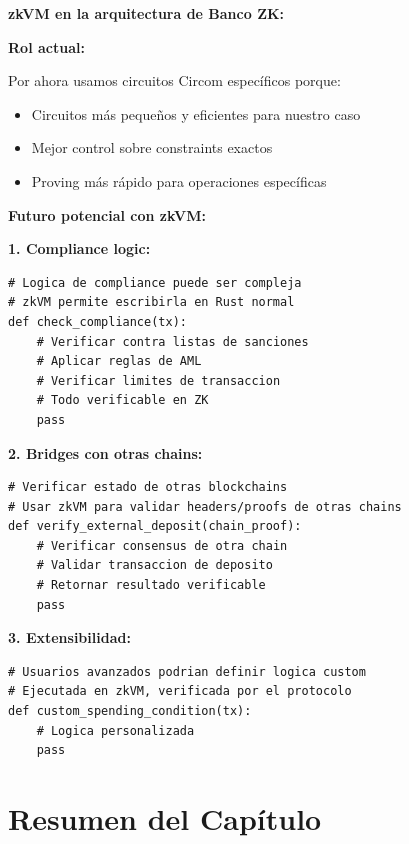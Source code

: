 \documentclass[11pt,a4paper,twoside]{book}
\begin{document}
\begin{bancozk}
\textbf{zkVM en la arquitectura de Banco ZK:}

\textbf{Rol actual:}

Por ahora usamos circuitos Circom espec\'ificos porque:
\begin{itemize}
    \item Circuitos m\'as peque\~nos y eficientes para nuestro caso
    \item Mejor control sobre constraints exactos
    \item Proving m\'as r\'apido para operaciones espec\'ificas
\end{itemize}

\textbf{Futuro potencial con zkVM:}

\textbf{1. Compliance logic:}
\begin{lstlisting}[style=python]
# Logica de compliance puede ser compleja
# zkVM permite escribirla en Rust normal
def check_compliance(tx):
    # Verificar contra listas de sanciones
    # Aplicar reglas de AML
    # Verificar limites de transaccion
    # Todo verificable en ZK
    pass
\end{lstlisting}

\textbf{2. Bridges con otras chains:}
\begin{lstlisting}[style=python]
# Verificar estado de otras blockchains
# Usar zkVM para validar headers/proofs de otras chains
def verify_external_deposit(chain_proof):
    # Verificar consensus de otra chain
    # Validar transaccion de deposito
    # Retornar resultado verificable
    pass
\end{lstlisting}

\textbf{3. Extensibilidad:}
\begin{lstlisting}[style=python]
# Usuarios avanzados podrian definir logica custom
# Ejecutada en zkVM, verificada por el protocolo
def custom_spending_condition(tx):
    # Logica personalizada
    pass
\end{lstlisting}
\end{bancozk}

\section{Resumen del Cap\'itulo}
\end{document}
